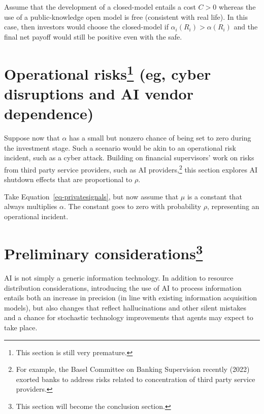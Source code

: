 \documentclass[
]{article}
\theoremstyle{plain}
\theoremstyle{definition}
\theoremstyle{remark}
\begin{document}
Assume that the development of a closed-model entails a cost \(C > 0\)
whereas the use of a public-knowledge open model is free (consistent
with real life). In this case, then investors would choose the
closed-model if \(\alpha_i(R_i) > \alpha(R_i)\) and the final net payoff
would still be positive even with the safe.

\section[Operational risks (eg, cyber disruptions and AI vendor
dependence)]{\texorpdfstring{Operational risks\footnote{This section is
  still very premature.} (eg, cyber disruptions and AI vendor
dependence)}{Operational risks (eg, cyber disruptions and AI vendor dependence)}}\label{operational-riskswipoprisk-eg-cyber-disruptions-and-ai-vendor-dependence}

Suppose now that \(\alpha\) has a small but nonzero chance of being set
to zero during the investment stage. Such a scenario would be akin to an
operational risk incident, such as a cyber attack. Building on financial
supervisors' work on risks from third party service providers, such as
AI providers,\footnote{For example, the Basel Committee on Banking
  Supervision recently (2022) exorted banks to address risks related to
  concentration of third party service providers.} this section explores
AI shutdown effects that are proportional to \(\rho\).

Take Equation~\ref{eq-privatesignals}, but now assume that \(\mu\) is a
constant that always multiplies \(\alpha\). The constant goes to zero
with probability \(\rho\), representing an operational incident.

\section[Preliminary considerations]{\texorpdfstring{Preliminary
considerations\footnote{This section will become the conclusion section.}}{Preliminary considerations}}\label{preliminary-considerationsconcl}

AI is not simply a generic information technology. In addition to
resource distribution considerations, introducing the use of AI to
process information entails both an increase in precision (in line with
existing information acquisition models), but also changes that reflect
hallucinations and other silent mistakes and a chance for stochastic
technology improvements that agents may expect to take place.
\end{document}
